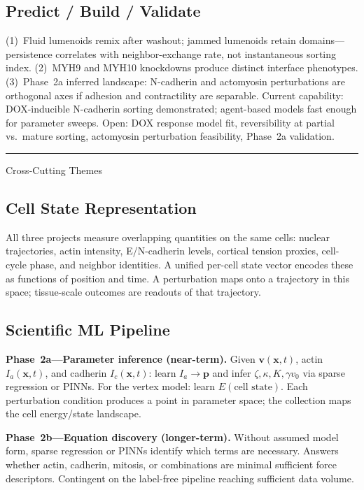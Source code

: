\documentclass[11pt, letterpaper]{article}
\newcommand{\projectsection}[2]{%
  \vspace{1.5em}
  {\large\bfseries\color{white}%
   \colorbox{#1}{\parbox{\dimexpr\linewidth-2\fboxsep\relax}{\strut\quad #2\strut}}}\par
  \vspace{0.4em}
}
\begin{document}
\subsection{Predict / Build / Validate}
(1)~Fluid lumenoids remix after washout; jammed lumenoids retain domains---persistence correlates with neighbor-exchange rate, not instantaneous sorting index. (2)~MYH9 and MYH10 knockdowns produce distinct interface phenotypes. (3)~Phase~2a inferred landscape: N-cadherin and actomyosin perturbations are orthogonal axes if adhesion and contractility are separable. Current capability: DOX-inducible N-cadherin sorting demonstrated; agent-based models fast enough for parameter sweeps. Open: DOX response model fit, reversibility at partial vs.\ mature sorting, actomyosin perturbation feasibility, Phase~2a validation.

\vspace{1em}\hrule

\projectsection{crossgreen}{Cross-Cutting Themes}

\subsection{Cell State Representation}
All three projects measure overlapping quantities on the same cells: nuclear trajectories, actin intensity, E/N-cadherin levels, cortical tension proxies, cell-cycle phase, and neighbor identities. A unified per-cell state vector encodes these as functions of position and time. A perturbation maps onto a trajectory in this space; tissue-scale outcomes are readouts of that trajectory.

\subsection{Scientific ML Pipeline}

\textbf{Phase~2a---Parameter inference (near-term).} Given $\mathbf{v}(\mathbf{x},t)$, actin $I_a(\mathbf{x},t)$, and cadherin $I_c(\mathbf{x},t)$: learn $I_a \to \mathbf{p}$ and infer $\zeta, \kappa, K, \gamma v_0$ via sparse regression or PINNs. For the vertex model: learn $E(\text{cell state})$. Each perturbation condition produces a point in parameter space; the collection maps the cell energy/state landscape.

\textbf{Phase~2b---Equation discovery (longer-term).} Without assumed model form, sparse regression or PINNs identify which terms are necessary. Answers whether actin, cadherin, mitosis, or combinations are minimal sufficient force descriptors. Contingent on the label-free pipeline reaching sufficient data volume.
\end{document}
